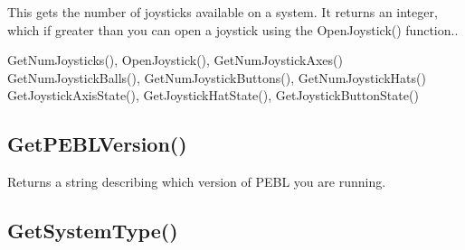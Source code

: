 \documentclass[letterpaper,10pt,english]{sphinxmanual}
\begin{document}
\sphinxAtStartPar
{}

\sphinxAtStartPar
This gets the number of joysticks available on a system. It returns an integer, which if greater than   you can open a joystick using the OpenJoystick() function..

\sphinxAtStartPar
{}

\sphinxAtStartPar
GetNumJoysticks(), OpenJoystick(), GetNumJoystickAxes() GetNumJoystickBalls(), GetNumJoystickButtons(), GetNumJoystickHats() GetJoystickAxisState(), GetJoystickHatState(), GetJoystickButtonState()

\ignorespaces 

\subsection{GetPEBLVersion()}
\label{\detokenize{reference/peblenvironment:getpeblversion}}\label{\detokenize{reference/peblenvironment:index-23}}
\sphinxAtStartPar
{}

\sphinxAtStartPar
{}

\sphinxAtStartPar
Returns a string describing which version of PEBL you are running.

\sphinxAtStartPar
{}

\begin{sphinxVerbatim}[commandchars=\\\{\}]
\end{sphinxVerbatim}

\sphinxAtStartPar
{}

\begin{sphinxVerbatim}[commandchars=\\\{\}]
\end{sphinxVerbatim}

\sphinxAtStartPar
{}

\sphinxAtStartPar
{}

\ignorespaces 

\subsection{GetSystemType()}
\label{\detokenize{reference/peblenvironment:getsystemtype}}\label{\detokenize{reference/peblenvironment:index-24}}
\sphinxAtStartPar
{}
\end{document}
